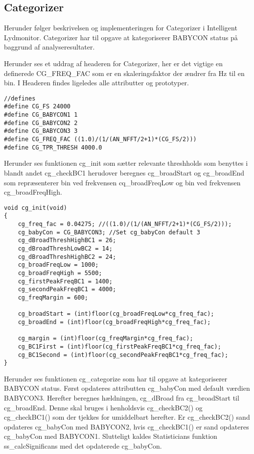 \subsection{Categorizer}
Herunder følger beskrivelsen og implementeringen for Categorizer i Intelligent Lydmonitor.
Categorizer har til opgave at kategoriserer BABYCON status på baggrund af analyseresultater. 


Herunder ses et uddrag af headeren for Categorizer, her er det vigtige en definerede CG\_FREQ\_FAC som er en skaleringsfaktor der ændrer fra Hz til en bin. I Headeren findes ligeledes alle attributter og prototyper.

\begin{verbatim}
//defines
#define CG_FS 24000
#define CG_BABYCON1 1
#define CG_BABYCON2 2
#define CG_BABYCON3 3
#define CG_FREQ_FAC ((1.0)/(1/(AN_NFFT/2+1)*(CG_FS/2)))
#define CG_TPR_THRESH 4000.0
\end{verbatim}

Herunder ses funktionen cg\_init som sætter relevante threshholds som benyttes i blandt andet cg\_checkBC1 herudover beregnes cg\_broadStart og cg\_broadEnd som repræsenterer bin ved frekvensen cq\_broadFreqLow og bin ved frekvensen cg\_broadFreqHigh. 

\begin{verbatim}
void cg_init(void)
{
	cg_freq_fac = 0.04275; //((1.0)/(1/(AN_NFFT/2+1)*(CG_FS/2)));
	cg_babyCon = CG_BABYCON3; //Set cg_babyCon default 3
	cg_dBroadThreshHighBC1 = 26;
	cg_dBroadThreshLowBC2 = 14;
	cg_dBroadThreshHighBC2 = 24;
	cg_broadFreqLow = 1000;
	cg_broadFreqHigh = 5500;
	cg_firstPeakFreqBC1 = 1400;
	cg_secondPeakFreqBC1 = 4000;
	cg_freqMargin = 600;

	cg_broadStart = (int)floor(cg_broadFreqLow*cg_freq_fac);
	cg_broadEnd = (int)floor(cg_broadFreqHigh*cg_freq_fac);

	cg_margin = (int)floor(cg_freqMargin*cg_freq_fac);
	cg_BC1First = (int)floor(cg_firstPeakFreqBC1*cg_freq_fac);
	cg_BC1Second = (int)floor(cg_secondPeakFreqBC1*cg_freq_fac);
}
\end{verbatim}

Herunder ses funktionen cg\_categorize som har til opgave at kategoriserer BABYCON status. 
Først opdateres attributten cg\_babyCon med default værdien BABYCON3. 
Herefter beregnes hældningen, cg\_dBroad fra cg\_broadStart til cg\_broadEnd. Denne skal bruges i henholdsvis cg\_checkBC2() og cg\_checkBC1() som der tjekkes for umiddelbart herefter. Er cg\_checkBC2() sand opdateres cg\_babyCon med BABYCON2, hvis cg\_checkBC1() er sand opdateres cg\_babyCon med BABYCON1.
Slutteligt kaldes Statisticians funktion ss\_calcSignificans med det opdaterede cg\_babyCon.

